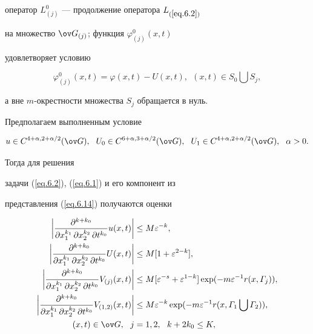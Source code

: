 оператор $L^0_{(j)}$ --- продолжение оператора $L_{(\ref{eq.6.2})}$


на множество $\ov G_{(j)}$; функция $\varphi^0_{(j)}(x,t)$


удовлетворяет условию


$$


\varphi^0_{(j)}(x,t)=\varphi(x,t)-U(x,t), \ \ (x,t)\in S_0\bigcup S_{j},


$$


а вне $m$-окрестности множества $S_j$ обращается в нуль.





Предполагаем выполненным условие


\begin{equation} \label{eq.6.16}


u\in C^{4+\alpha,2+\alpha/2}(\ov G),


\ \ U_0\in C^{6+\alpha,3+\alpha/2}(\ov G), \ \


U_1\in C^{4+\alpha,2+\alpha/2}(\ov G), \ \ \alpha>0.


\end{equation}


Тогда для решения


задачи (\ref{eq.6.2}), (\ref{eq.6.1}) и его компонент из


представления (\ref{eq.6.14}) получаются оценки


\begin{align} \label{eq.6.17}


\bigg|\frac{\partial^{k+k_0}}{\partial x_1^{k_1}\,\partial x_2^{k_2}


\,\partial t^{k_0}}u(x,t)\bigg|&\le M \varepsilon^{-k},\\


%


\bigg|\frac{\partial^{k+k_0}}{\partial x_1^{k_1}\,\partial x_2^{k_2}\,


\partial t^{k_0}}U(x,t)\bigg|&\le M [1+\varepsilon^{2-k}],\notag \\


%


\bigg|\frac{\partial^{k+k_0}}{\partial x_1^{k_1}\,\partial x_2^{k_2}


\,\partial t^{k_0}}V_{(j)}(x,t)\bigg|&\le


M [\varepsilon^{-s}+\varepsilon^{1-k}]


\exp(-m\varepsilon^{-1}r(x,\varGamma_j)),\notag\\


%


\bigg|\frac{\partial^{k+k_0}}{\partial x_1^{k_1}\,\partial x_2^{k_2}


\, \partial t^{k_0}}V_{(1,2)}(x,t)\bigg|&\le


M \varepsilon^{-k}\exp(-m\varepsilon^{-1}r


(x,\varGamma_1\bigcup\varGamma_2)), \notag\\


%


(x,t)\in \ov G, \ \ j&=1,2, \ \ k+2k_0\le K,\notag


\end{align}


